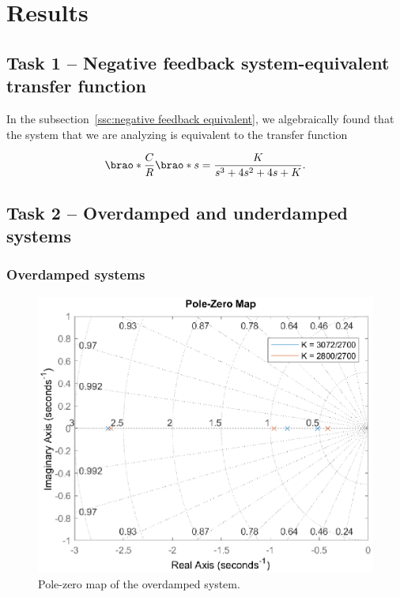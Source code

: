 \documentclass[12pt]{article}
\DeclarePairedDelimiter\brao()%
\begin{document}
\section{Results}

\subsection{Task 1 -- Negative feedback system-equivalent transfer function}

In the  subsection~\ref{ssc:negative feedback equivalent}, we algebraically found that the system that we are analyzing is equivalent to the transfer function

\begin{equation}
    \brao*{\frac{C}{R}}\brao*s = \frac{K}{s^3 + 4s^2 + 4s + K}.
\end{equation}

\subsection{Task 2 -- Overdamped and underdamped systems}

\subsubsection{Overdamped systems}\label{sss:overdamped results}

\begin{figure}
    \centering
    \includegraphics[width=\linewidth]{img/task02_01_overdamped_pzmap.eps}
    \caption{Pole-zero map of the overdamped system.}
    \label{fig:overdamped pzmap}
\end{figure}
\end{document}
